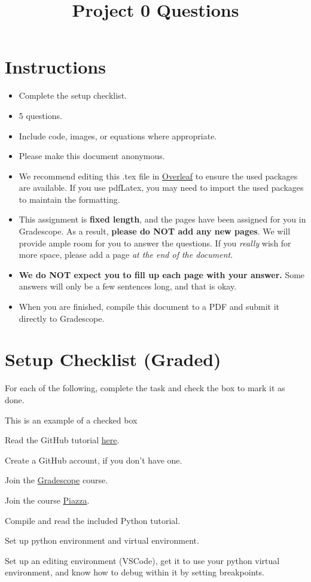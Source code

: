 \documentclass[11pt]{article}
\date{}
\title{\vspace{-1cm}Project 0 Questions}
\newcommand{\cmark}{\ding{51}}%
\newcommand{\done}{\rlap{$\square$}{\raisebox{2pt}{\large\hspace{1pt}\cmark}}%
\hspace{-2.5pt}}
\begin{document}
\maketitle
\vspace{-2cm}
\thispagestyle{fancy}

\section*{Instructions}
\begin{itemize}
  \item Complete the setup checklist.
  \item 5 questions.
  \item Include code, images, or equations where appropriate.
  \item Please make this document anonymous.
  \item We recommend editing this .tex file in \href{https://www.overleaf.com/}{Overleaf} to ensure the used packages are available. If you use pdfLatex, you may need to import the used packages to maintain the formatting.
  \item This assignment is \textbf{fixed length}, and the pages have been assigned for you in Gradescope. As a result, \textbf{please do NOT add any new pages}. We will provide ample room for you to answer the questions. If you \emph{really} wish for more space, please add a page \emph{at the end of the document}.
  \item \textbf{We do NOT expect you to fill up each page with your answer.} Some answers will only be a few sentences long, and that is okay.
  \item When you are finished, compile this document to a PDF and submit it directly to Gradescope.

\end{itemize}

\section*{Setup Checklist (Graded)}

For each of the following, complete the task and check the box to mark it as done.
\begin{todolist}
    \item[\done] This is an example of a checked box
    \item Read the GitHub tutorial \href{https://docs.google.com/document/d/1Hli-42Tv91tnghbxW4Pn44aGGeV9MMb4NgIktg9jN-U/edit?usp=sharing}{here}.
    \item Create a GitHub account, if you don't have one.
    \item Join the \href{https://www.gradescope.com/}{Gradescope} course.
    \item Join the course \href{https://piazza.com/}{Piazza}.
    \item Compile and read the included Python tutorial.
    \item Set up python environment and virtual environment.
    \item Set up an editing environment (VSCode), get it to use your python virtual environment, and know how to debug within it by setting breakpoints.
\end{todolist}
\end{document}
